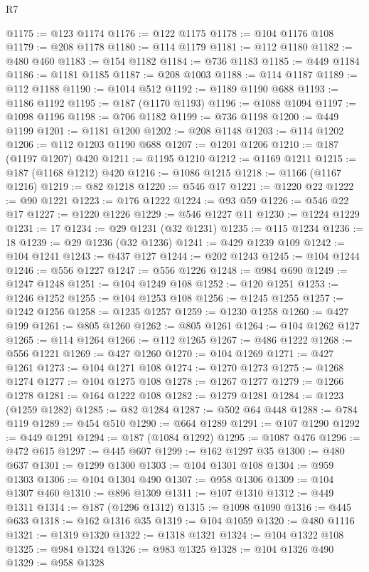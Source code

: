 \begin{lexlean}{R7}
\begin{coremodule}
@1175 := @123 @1174
@1176 := @122 @1175
@1178 := @104 @1176 @108
@1179 := @208 @1178
@1180 := @114 @1179
@1181 := @112 @1180
@1182 := @480 @460
@1183 := @154 @1182
@1184 := @736 @1183
@1185 := @449 @1184
@1186 := @1181 @1185
@1187 := @208 @1003
@1188 := @114 @1187
@1189 := @112 @1188
@1190 := @1014 @512
@1192 := @1189 @1190 @688
@1193 := @1186 @1192
@1195 := @187 (@1170 @1193)
@1196 := @1088 @1094
@1197 := @1098 @1196
@1198 := @706 @1182
@1199 := @736 @1198
@1200 := @449 @1199
@1201 := @1181 @1200
@1202 := @208 @1148
@1203 := @114 @1202
@1206 := @112 @1203 @1190 @688
@1207 := @1201 @1206
@1210 := @187 (@1197 @1207) @420
@1211 := @1195 @1210
@1212 := @1169 @1211
@1215 := @187 (@1168 @1212) @420
@1216 := @1086 @1215
@1218 := @1166 (@1167 @1216)
@1219 := @82 @1218
@1220 := @546 @17
@1221 := @1220 @22
@1222 := @90 @1221
@1223 := @176 @1222
@1224 := @93 @59
@1226 := @546 @22 @17
@1227 := @1220 @1226
@1229 := @546 @1227 @11
@1230 := @1224 @1229
@1231 := 17
@1234 := @29 @1231 (@32 @1231)
@1235 := @115 @1234
@1236 := 18
@1239 := @29 @1236 (@32 @1236)
@1241 := @429 @1239 @109
@1242 := @104 @1241
@1243 := @437 @127
@1244 := @202 @1243
@1245 := @104 @1244
@1246 := @556 @1227
@1247 := @556 @1226
@1248 := @984 @690
@1249 := @1247 @1248
@1251 := @104 @1249 @108
@1252 := @120 @1251
@1253 := @1246 @1252
@1255 := @104 @1253 @108
@1256 := @1245 @1255
@1257 := @1242 @1256
@1258 := @1235 @1257
@1259 := @1230 @1258
@1260 := @427 @199
@1261 := @805 @1260
@1262 := @805 @1261
@1264 := @104 @1262 @127
@1265 := @114 @1264
@1266 := @112 @1265
@1267 := @486 @1222
@1268 := @556 @1221
@1269 := @427 @1260
@1270 := @104 @1269
@1271 := @427 @1261
@1273 := @104 @1271 @108
@1274 := @1270 @1273
@1275 := @1268 @1274
@1277 := @104 @1275 @108
@1278 := @1267 @1277
@1279 := @1266 @1278
@1281 := @164 @1222 @108
@1282 := @1279 @1281
@1284 := @1223 (@1259 @1282)
@1285 := @82 @1284
@1287 := @502 @64 @448
@1288 := @784 @119
@1289 := @454 @510
@1290 := @664 @1289
@1291 := @107 @1290
@1292 := @449 @1291
@1294 := @187 (@1084 @1292)
@1295 := @1087 @476
@1296 := @472 @615
@1297 := @445 @607
@1299 := @162 @1297 @35
@1300 := @480 @637
@1301 := @1299 @1300
@1303 := @104 @1301 @108
@1304 := @959 @1303
@1306 := @104 @1304 @490
@1307 := @958 @1306
@1309 := @104 @1307 @460
@1310 := @896 @1309
@1311 := @107 @1310
@1312 := @449 @1311
@1314 := @187 (@1296 @1312)
@1315 := @1098 @1090
@1316 := @445 @633
@1318 := @162 @1316 @35
@1319 := @104 @1059
@1320 := @480 @1116
@1321 := @1319 @1320
@1322 := @1318 @1321
@1324 := @104 @1322 @108
@1325 := @984 @1324
@1326 := @983 @1325
@1328 := @104 @1326 @490
@1329 := @958 @1328

\end{coremodule}
\end{lexlean}
